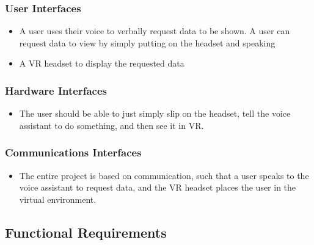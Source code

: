 \documentclass[onecolumn, draftclsnofoot,10pt, compsoc]{IEEEtran}
\begin{document}
        \subsubsection{User Interfaces}
            \begin{itemize}
                \item A user uses their voice to verbally request data to be shown. A user can request data to view by simply putting on the headset and speaking
                \item A VR headset to display the requested data
            \end{itemize}
            
            \subsubsection{Hardware Interfaces}
            \begin{itemize}
                \item The user should be able to just simply slip on the headset, tell the voice assistant to do something, and then see it in VR.
            \end{itemize}
            
            \subsubsection{Communications Interfaces}
            \begin{itemize}
                \item The entire project is based on communication, such that a user speaks to the voice assistant to request data, and the VR headset places the user in the virtual environment. 
            \end{itemize}
            
    \subsection{Functional Requirements}
    
\end{document}
